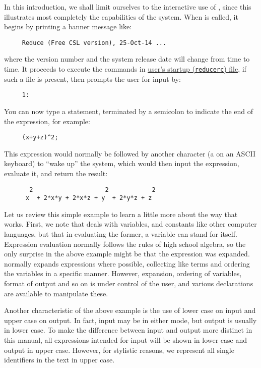 In this introduction, we shall limit ourselves to the interactive use of
{\REDUCE}, since this illustrates most completely the capabilities of the
system. When {\REDUCE} is called, it begins by printing a banner message
like:
\begin{verbatim}
     Reduce (Free CSL version), 25-Oct-14 ...
\end{verbatim}
where the version number and the system release date will change from time
to time. It proceeds to execute the commands in \hyperlink{startup file}{user's startup (\texttt{reducerc}) file}, if such a file is present,
then prompts the user for input by:
\begin{verbatim}
     1:
\end{verbatim}
You can now type a {\REDUCE} statement, terminated by a semicolon to indicate
the end of the expression, for example:
\begin{verbatim}
     (x+y+z)^2;
\end{verbatim}
This expression would normally be followed by another character (a
 on an ASCII keyboard) to ``wake up'' the system, which would
then input the expression, evaluate it, and return the result:
\begin{verbatim}
       2                    2            2
      x  + 2*x*y + 2*x*z + y  + 2*y*z + z
\end{verbatim}
Let us review this simple example to learn a little more about the way that
{\REDUCE} works. First, we note that {\REDUCE} deals with variables, and
constants like other computer languages, but that in evaluating the former,
a variable can stand for itself. Expression evaluation normally follows
the rules of high school algebra, so the only surprise in the above example
might be that the expression was expanded. {\REDUCE} normally expands
expressions where possible, collecting like terms and ordering the
variables in a specific manner. However, expansion, ordering of variables,
format of output and so on is under control of the user, and various
declarations are available to manipulate these.

Another characteristic of the above example is the use of lower case on
input and upper case on output.  In fact, input may be in either mode, but
output is usually in lower case.  To make the difference between input and
output more distinct in this manual, all expressions intended for input
will be shown in lower case and output in upper case.  However, for
stylistic reasons, we represent all single identifiers in the text in
upper case.

